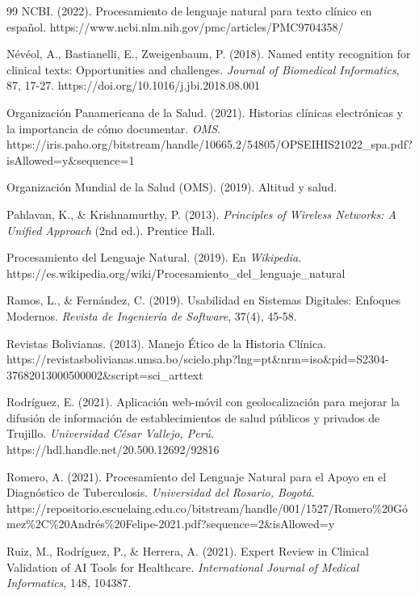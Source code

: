 \documentclass[12pt,a4paper]{article}
\begin{document}
\begin{thebibliography}{99}
NCBI. (2022). Procesamiento de lenguaje natural para texto clínico en español. https://www.ncbi.nlm.nih.gov/pmc/articles/PMC9704358/

Névéol, A., Bastianelli, E., Zweigenbaum, P. (2018). Named entity recognition for clinical texts: Opportunities and challenges. \textit{Journal of Biomedical Informatics}, 87, 17-27. https://doi.org/10.1016/j.jbi.2018.08.001

Organización Panamericana de la Salud. (2021). Historias clínicas electrónicas y la importancia de cómo documentar. \textit{OMS}. https://iris.paho.org/bitstream/handle/10665.2/54805/OPSEIHIS21022\_spa.pdf?isAllowed=y\&sequence=1

Organización Mundial de la Salud (OMS). (2019). Altitud y salud.

Pahlavan, K., \& Krishnamurthy, P. (2013). \textit{Principles of Wireless Networks: A Unified Approach} (2nd ed.). Prentice Hall.

Procesamiento del Lenguaje Natural. (2019). En \textit{Wikipedia}. https://es.wikipedia.org/wiki/Procesamiento\_del\_lenguaje\_natural

Ramos, L., \& Fernández, C. (2019). Usabilidad en Sistemas Digitales: Enfoques Modernos. \textit{Revista de Ingeniería de Software}, 37(4), 45-58.

Revistas Bolivianas. (2013). Manejo Ético de la Historia Clínica. https://revistasbolivianas.umsa.bo/scielo.php?lng=pt\&nrm=iso\&pid=S2304-37682013000500002\&script=sci\_arttext

Rodríguez, E. (2021). Aplicación web-móvil con geolocalización para mejorar la difusión de información de establecimientos de salud públicos y privados de Trujillo. \textit{Universidad César Vallejo, Perú}. https://hdl.handle.net/20.500.12692/92816

Romero, A. (2021). Procesamiento del Lenguaje Natural para el Apoyo en el Diagnóstico de Tuberculosis. \textit{Universidad del Rosario, Bogotá}. https://repositorio.escuelaing.edu.co/bitstream/handle/001/1527/Romero\%20Gómez\%2C\%20Andrés\%20Felipe-2021.pdf?sequence=2\&isAllowed=y

Ruiz, M., Rodríguez, P., \& Herrera, A. (2021). Expert Review in Clinical Validation of AI Tools for Healthcare. \textit{International Journal of Medical Informatics}, 148, 104387.


\end{thebibliography}
\end{document}
